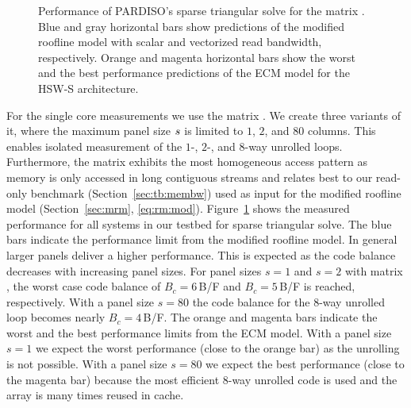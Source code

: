 \begin{figure}[tp]
{\label{fig:p:single-core:zen-s}
} %
  \caption{Performance of PARDISO's sparse triangular solve
    for the matrix . %
    Blue and gray horizontal bars show predictions of the modified roofline model 
    with scalar and vectorized read bandwidth, respectively.
    Orange and magenta horizontal bars show the worst and the best performance predictions of the ECM model for the HSW-S architecture.
    }%
  \label{fig:p:single-core}%
\end{figure}


For the single core measurements we use the matrix .
We create three variants of it, where the maximum panel size $s$ is
limited to $1$, $2$, and $80$ columns.
This enables isolated measurement of the $1$-, $2$-, and $8$-way
unrolled loops.
Furthermore, the matrix  exhibits the most homogeneous access pattern
as memory is only accessed in long contiguous streams and relates best to our
read-only benchmark (Section~\ref{sec:tb:membw}) used as input for the modified
roofline model (Section~\ref{sec:mrm}, \eqref{eq:rm:mod}).
%
Figure~\ref{fig:p:single-core} shows the measured performance for all systems in
our testbed for sparse triangular solve.
The blue bars indicate the performance limit from the modified roofline model.
%
In general larger panels deliver a higher performance.
This is expected as the code balance decreases with increasing panel sizes.
For panel sizes $s=1$ and $s=2$ with matrix , the worst case code balance
of $B_c=6$\,B/F and $B_c=5$\,B/F is reached, respectively. 
With a panel size $s=80$ the code balance for the $8$-way unrolled loop
becomes nearly $B_c=4$\,B/F.
The orange and magenta bars indicate the worst and the best performance limits from the ECM model. With a panel size $s=1$ we expect the worst performance (close to the orange bar) as the unrolling is not possible. With a panel size $s=80$ we expect the best performance (close to the magenta bar) because the most efficient 8-way unrolled code is used and the array \vindx{} is many times reused in cache.
  
